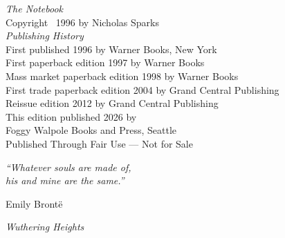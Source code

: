 \documentclass[10pt, twoside, openright]{book}
\begin{document}
	\newpage
	\thispagestyle{empty}
	\vspace*{\fill}
	
	{\setlength{\parindent}{0pt}%
		\fontsize{7.5}{11}\selectfont
		
		\textit{The Notebook}\\
		Copyright \textcopyright\ 1996 by Nicholas Sparks\\[0.6em]
		
		\textit{Publishing History}\\
		First published 1996 by Warner Books, New York\\
		First paperback edition 1997 by Warner Books\\
		Mass market paperback edition 1998 by Warner Books\\
		First trade paperback edition 2004 by Grand Central Publishing\\
		Reissue edition 2012 by Grand Central Publishing\\[0.6em]
		
		This edition published 2026 by\\
		Foggy Walpole Books and Press, Seattle\\[0.6em]
		
		Published Through Fair Use --- Not for Sale\\[0.6em]
	}



	\newpage
	\thispagestyle{empty}
	\vspace*{\fill}
	
	\begin{flushright}
		{\fontsize{11}{16}\selectfont\itshape
			``Whatever souls are made of,\\
			his and mine are the same.''\par}
		
		\vspace{0.9em}
		
		{\fontsize{8}{11}\selectfont{}%
			Emily Bront\"{e}\par}
		
		\vspace{0.2em}
		
		{\fontsize{7.5}{11}\selectfont{}%
			\textit{Wuthering Heights}\par}
	\end{flushright}
	
\end{document}
